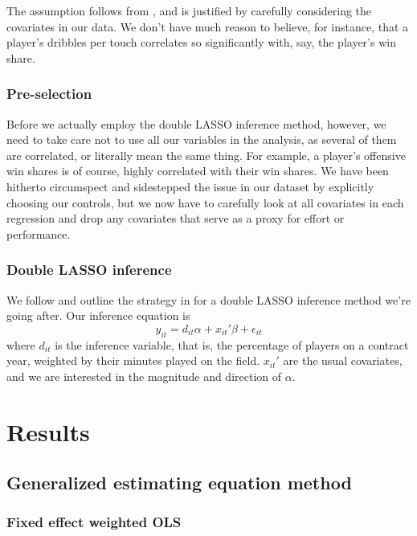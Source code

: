 \documentclass[12pt]{article}
\begin{document}
	The assumption follows from \cite{belloni_high-dimensional_2014}, and is justified by carefully considering the covariates in our data. We don't have much reason to believe, for instance, that a player's dribbles per touch correlates so significantly with, say, the player's win share.
	
	\subsubsection{Pre-selection}
	
	Before we actually employ the double LASSO inference method, however, we need to take care not to use all our variables in the analysis, as several of them are correlated, or literally mean the same thing. For example, a player's offensive win shares is of course, highly correlated with their win shares. We have been hitherto circumspect and sidestepped the issue in our dataset by explicitly choosing our controls, but we now have to carefully look at all covariates in each regression and drop any covariates that serve as a proxy for effort or performance.
	
	\subsubsection{Double LASSO inference}
	
	We follow and outline the strategy in \cite{chernozhukov_high-dimensional_2016-1} for a double LASSO inference method we're going after. Our inference equation is \[
	y_{it} = d_{it} \alpha + x_{it}'\beta + \epsilon_{it}
	\] where $d_{it}$ is the inference variable, that is, the percentage of players on a contract year, weighted by their minutes played on the field. $x_{it}'$ are the usual covariates, and we are interested in the magnitude and direction of $\alpha$.
	
	\section{Results} \label{sec:result}
	
	\subsection{Generalized estimating equation method}
	
	\subsubsection{Fixed effect weighted OLS}
	
\end{document}
